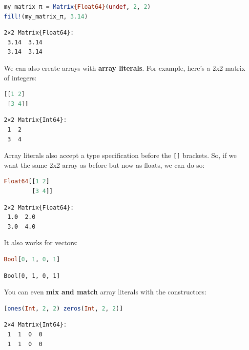 \documentclass[
  notoc %
]{tufte-book}
\newcommand{\passthrough}[1]{#1}
\begin{document}
\begin{lstlisting}[language=Julia]
my_matrix_π = Matrix{Float64}(undef, 2, 2)
fill!(my_matrix_π, 3.14)
\end{lstlisting}

\begin{lstlisting}[language=Output]
2×2 Matrix{Float64}:
 3.14  3.14
 3.14  3.14
\end{lstlisting}

We can also create arrays with \textbf{array literals}. For example,
here's a 2x2 matrix of integers:

\begin{lstlisting}[language=Julia]
[[1 2]
 [3 4]]
\end{lstlisting}

\begin{lstlisting}[language=Output]
2×2 Matrix{Int64}:
 1  2
 3  4
\end{lstlisting}

Array literals also accept a type specification before the
\passthrough{\lstinline![]!} brackets. So, if we want the same 2x2 array
as before but now as floats, we can do so:

\begin{lstlisting}[language=Julia]
Float64[[1 2]
        [3 4]]
\end{lstlisting}

\begin{lstlisting}[language=Output]
2×2 Matrix{Float64}:
 1.0  2.0
 3.0  4.0
\end{lstlisting}

It also works for vectors:

\begin{lstlisting}[language=Julia]
Bool[0, 1, 0, 1]
\end{lstlisting}

\begin{lstlisting}[language=Output]
Bool[0, 1, 0, 1]
\end{lstlisting}

You can even \textbf{mix and match} array literals with the
constructors:

\begin{lstlisting}[language=Julia]
[ones(Int, 2, 2) zeros(Int, 2, 2)]
\end{lstlisting}

\begin{lstlisting}[language=Output]
2×4 Matrix{Int64}:
 1  1  0  0
 1  1  0  0
\end{lstlisting}
\end{document}
